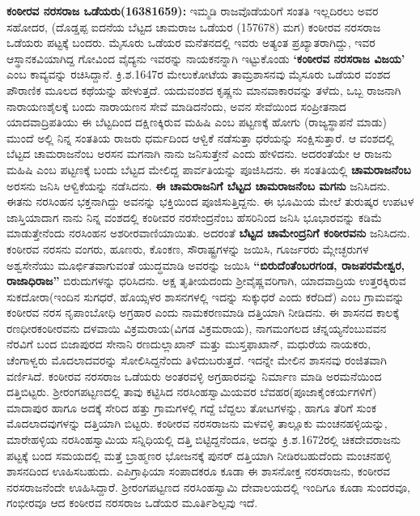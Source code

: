 \textbf{ ಕಂಠೀರವ ನರಸರಾಜ ಒಡೆಯರು(1638\general{\enginline{-}}1659):} ಇಮ್ಮಡಿ ರಾಜವೊಡೆಯರಿಗೆ ಸಂತತಿ ಇಲ್ಲದಿರಲು ಅವರ ಸಹೋದರ, (ದೊಡ್ಡಪ್ಪ ಐದನೆಯ ಬೆಟ್ಟದ ಚಾಮರಾಜ ಒಡೆಯರ (1576\enginline{-}78) ಮಗ) ಕಂಠೀರವ ನರಸರಾಜ ಒಡೆಯರು ಪಟ್ಟಕ್ಕೆ ಬಂದರು. ಮೈಸೂರು ಒಡೆಯರ ಮನೆತನದಲ್ಲಿ ಇವರು ಅತ್ಯಂತ ಪ್ರಖ್ಯಾತರಾಗಿದ್ದು, ಇವರ ಆಸ್ಥಾನಕವಿಯಾಗಿದ್ದ ಗೋವಿಂದ ವೈದ್ಯನು ಇವರನ್ನು ನಾಯಕನನ್ನಾಗಿ ಇಟ್ಟುಕೊಂಡು \textbf{‘ಕಂಠೀರವ ನರಸರಾಜ ವಿಜಯ’} ಎಂಬ ಕಾವ್ಯವನ್ನು ರಚಿಸಿದ್ದಾನೆ. ಕ್ರಿ.ಶ.1647ರ ಮೇಲುಕೋಟೆಯ ತಾಮ್ರಶಾಸನವು ಮೈಸೂರು ಒಡೆಯರ ವಂಶದ ಪೌರಾಣಿಕ ಮೂಲದ ಕಥೆಯನ್ನು ಹೇಳುತ್ತದೆ. ಯದುವಂಶದ ಕೃಷ್ಣನು ಮಾನವಾಕಾರವನ್ನು ತಳೆದು, ಒಬ್ಬ ರಾಜನಾಗಿ ನಾರಾಯಣಶೈಲಕ್ಕೆ ಬಂದು ನಾರಾಯಣನ ಸೇವೆ ಮಾಡಿದನೆಂದು, ಅವನ ಸೇವೆಯಿಂದ ಸಂಪ್ರೀತನಾದ ಯಾದವಾದ್ರಿಪತಿಯು ಈ ಬೆಟ್ಟದಿಂದ ದಕ್ಷಿಣಕ್ಕಿರುವ ಮಹಿಷಿ ಎಂಬ ಪಟ್ಟಣಕ್ಕೆ ಹೋಗು (ರಾಜ್ಯಸ್ಥಾಪನೆ ಮಾಡು) ಮುಂದೆ ಅಲ್ಲಿ ನಿನ್ನ ಸಂತತಿಯ ರಾಜರು ಧರ್ಮದಿಂದ ಆಳ್ವಿಕೆ ನಡೆಸುತ್ತಾ ಧರೆಯನ್ನು ಸಂಕ್ಷಿಸುತ್ತಾರೆ. ಆ ವಂಶದಲ್ಲಿ ಬೆಟ್ಟದ ಚಾಮರಾಜನೆಂಬ ಅರಸನ ಮಗನಾಗಿ ನಾನು ಜನಿಸುತ್ತೇನೆ ಎಂದು ಹೇಳಿದನು. ಅದರಂತೆಯೇ ಆ ರಾಜನು ಮಹಿಷಿ ಎಂಬ ಪಟ್ಟಣಕ್ಕೆ ಬಂದು ಬೆಟ್ಟದ ಮೇಲಿದ್ದ ಪಾರ್ವತಿಯನ್ನು ಪೂಜಿಸಿದನು. ಈ ಸಂತತಿಯಲ್ಲಿ \textbf{ಚಾಮರಾಜನೆಂಬ} ಅರಸನು ಜನಿಸಿ ಆಳ್ವಿಕೆಯನ್ನು ನಡೆಸಿದನು. \textbf{ಈ ಚಾಮರಾಜನಿಗೆ ಬೆಟ್ಟದ ಚಾಮರಾಜನೆಂಬ ಮಗನು} ಜನಿಸಿದನು. ಈತನು ನರಸಿಂಹನ ಭಕ್ತನಾಗಿದ್ದು ಅವನನ್ನು ಭಕ್ತಿಯಿಂದ ಪೂಜಿಸುತ್ತಿದ್ದನು. ಈ ಭೂಮಿಯ ಮೇಲೆ ತುರುಷ್ಕರ ಉಪಟಳ ಜಾಸ್ತಿಯಾದಾಗ ನಾನು ನಿನ್ನ ವಂಶದಲ್ಲಿ ಕಂಠೀವರ ನರಸೇಂದ್ರನೆಂಬ ಹೆಸರಿನಿಂದ ಜನಿಸಿ ಭೂಭಾರವನ್ನು ಕಡಿಮೆ ಮಾಡುತ್ತೇನೆಂದು ನರಸಿಂಹನ ಅಶರೀರವಾಣಿಯಾಯಿತು. ಅದರಂತೆ \textbf{ಬೆಟ್ಟದ ಚಾಮೇಂದ್ರನಿಗೆ ಕಂಠೀರವನು} ಜನಿಸಿದನು. ಕಂಠೀರವ ನರಸನು ವಂಗರು, ಹೂಣರು, ಕೊಂಕಣ, ಸೌರಾಷ್ಟ್ರಗಳನ್ನು ಜಯಿಸಿ, ಗೂರ್ಜರರು ಮ್ಲೇಚ್ಛರುಗಳ ಅಶ್ವಸೇನೆಯು ಮೂರ್ಛಿತವಾಗುವಂತೆ ಯುದ್ಧಮಾಡಿ ಅವರನ್ನು ಜಯಿಸಿ \textbf{“ಬಿರುದೆಂತೆಂಬರಗಂಡ, ರಾಜಪರಮೇಶ್ವರ, ರಾಜಾಧಿರಾಜ”} ಬಿರುದುಗಳನ್ನು ಧರಿಸಿದನು. ಅಕ್ಷ ತೃತೀಯದಂದು ಶ‍್ರೀವೈಷ್ಣವರಿಗಾಗಿ, ಯಾದವಾದ್ರಿಯ ಉತ್ತರಕ್ಕಿರುವ ಸುಕದೋರಾ(ಇಂದಿನ ಸುಗಧರೆ, ಹೊಯ್ಸಳರ ಶಾಸನಗಳಲ್ಲಿ ಇದನ್ನು ಸುಕ್ಕುಧರೆ ಎಂದು ಕರೆದಿದೆ) ಎಂಬ ಗ್ರಾಮವನ್ನು ಕಂಠೀರವ ನರಸ ನೃಪಾಂಬೋಧಿ ಅಗ್ರಹಾರ ಎಂದು ನಾಮಕರಣಮಾಡಿ ದತ್ತಿಯಾಗಿ ನೀಡಿದನು. ಈ ಶಾಸನದ ಕಾಲಕ್ಕೆ ರಣಧೀರಕಂಠೀರವನು ದಳವಾಯಿ ವಿಕ್ರಮರಾಯ(ವಿಗಡ ವಿಕ್ರಮರಾಯ), ನಾಗಮಂಗಲದ ಚೆನ್ನಯ್ಯನೆಂಬುವವನ ನೆರವಿಗೆ ಬಂದ ಬಿಜಾಪುರದ ಸೇನಾನಿ ರಣದುಲ್ಲಾಖಾನ್​ ಮತ್ತು ಮುಸ್ತಫಾಖಾನ್​, ಮಧುರೆಯ ನಾಯಕರು, ಚೆಂಗಾಳ್ವರು ಮೊದಲಾದವರನ್ನು ಸೋಲಿಸಿದ್ದನೆಂದು ತಿಳಿದುಬರುತ್ತದೆ. ಇದನ್ನೇ ಮೇಲಿನ ಶಾಸನವು ರಂಜಿತವಾಗಿ ವರ್ಣಿಸಿದೆ. ಕಂಠೀರವ ನರಸರಾಜ ಒಡೆಯರು ಅಂತರವಳ್ಳಿ ಅಗ್ರಹಾರವನ್ನು ನಿರ್ಮಾಣ ಮಾಡಿ ಅರಮನೆಯಿಂದ ದತ್ತಿಬಿಟ್ಟರು. ಶ‍್ರೀರಂಗಪಟ್ಟಣದಲ್ಲಿ ತಾವು ಕಟ್ಟಿಸಿದ ನರಸಿಂಹಸ್ವಾಮಿಯವರ ಬೆವಹರ(ಪೂಜಾಕೈಂಕರ್ಯ\-ಗಳಿಗೆ) ಮಾದಾಪುರ ಹಾಗೂ ಅದಕ್ಕೆ ಸೇರಿದ ಹತ್ತು ಗ್ರಾಮಗಳಲ್ಲಿ ಗದ್ದೆ ಬೆದ್ದಲು ತೋಟಗಳನ್ನು, ಹಾಗೂ ತೆರಿಗೆ ಸುಂಕ ಮೊದಲಾದವುಗಳನ್ನು ದತ್ತಿಯಾಗಿ ಬಿಟ್ಟರು. ಕಂಠೀರವ ನರಸರಾಜನು ಮಳವಳ್ಳಿ ತಾಲ್ಲೂಕು ಮಂಚನಹಳ್ಳಿಯನ್ನು, ಮಾರೇಹಳ್ಳಿಯ ನರಸಿಂಹಸ್ವಾಮಿಯ ಸನ್ನಿಧಿಯಲ್ಲಿ ದತ್ತಿ ಬಿಟ್ಟಿದ್ದನೆಂದೂ, ಅದನ್ನು ಕ್ರಿ.ಶ.1672ರಲ್ಲಿ ಚಿಕದೇವರಾಜನು ಪಟ್ಟಕ್ಕೆ ಬಂದ ಸಮಯದಲ್ಲಿ ಮತ್ತೆ ಬ್ರಾಹ್ಮಣರ ಭೋಜನಕ್ಕೆ ಪುನರ್​ ದತ್ತಿಯಾಗಿ ನೀಡಿರಬಹುದೆಂದು ಮಂಚನಹಳ್ಳಿ ಶಾಸನದಿಂದ ಊಹಿಸಬಹುದು. ಎಪಿಗ್ರಾಫಿಯಾ ಸಂಪಾದಕರೂ ಕೂಡಾ ಈ ಶಾಸನೋಕ್ತ ನರಸರಾಜನು, ಕಂಠೀರವ ನರಸರಾಜನೆಂದೇ ಊಹಿಸಿದ್ದಾರೆ. ಶ‍್ರೀರಂಗಪಟ್ಟಣದ ನರಸಿಂಹಸ್ವಾಮಿ ದೇವಾಲಯದಲ್ಲಿ ಇಂದಿಗೂ ಕೂಡಾ ಸುಂದರವೂ, ಗಂಭೀರವೂ ಆದ ಕಂಠೀರವ ನರಸರಾಜ ಒಡೆಯರ ಮೂರ್ತಿಶಿಲ್ಪವು ಇದೆ.

